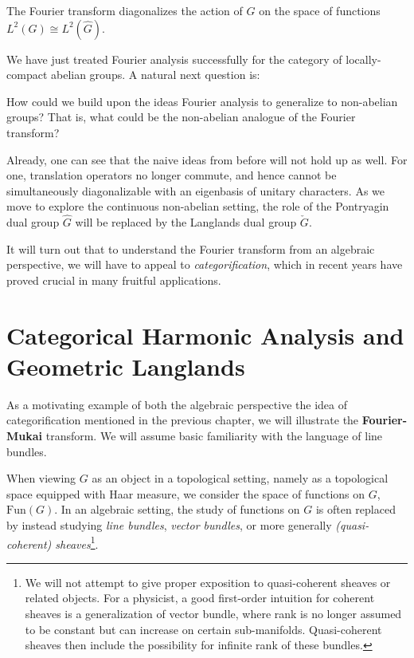 \begin{fact}
	The Fourier transform diagonalizes the action of $G$ on the space of functions $L^2(G) \cong L^2(\hat G)$.
\end{fact}

We have just treated Fourier analysis successfully for the category of locally-compact abelian groups. A natural next question is:
\begin{ques}
	How could we build upon the ideas Fourier analysis to generalize to non-abelian groups? That is, what could be the non-abelian analogue of the Fourier transform?
\end{ques}
Already, one can see that the naive ideas from before will not hold up as well. For one, translation operators no longer commute, and hence cannot be simultaneously diagonalizable with an eigenbasis of unitary characters. As we move to explore the continuous non-abelian setting, the role of the Pontryagin dual group $\hat G$ will be replaced by the Langlands dual group $\check G$.

It will turn out that to understand the Fourier transform from an algebraic perspective, we will have to appeal to \emph{categorification}, which in recent years have proved crucial in many fruitful applications.


\section{Categorical Harmonic Analysis and Geometric Langlands} %
\label{sec:categorical_harmonic_analysis_and_geometric_langlands}

As a motivating example of both the algebraic perspective the idea of categorification mentioned in the previous chapter, we will illustrate the \textbf{Fourier-Mukai} transform. We will assume basic familiarity with the language of line bundles. 

When viewing $G$ as an object in a topological setting, namely as a topological space equipped with Haar measure, we consider the space of functions on $G$, $\mathrm{Fun}(G)$. In an algebraic setting, the study of functions on $G$ is often replaced by instead studying \emph{line bundles}, \emph{vector bundles}, or more generally \emph{(quasi-coherent) sheaves}\footnote{We will not attempt to give proper exposition to quasi-coherent sheaves or related objects. For a physicist, a good first-order intuition for coherent sheaves is a generalization of vector bundle, where rank is no longer assumed to be constant but can increase on certain sub-manifolds. Quasi-coherent sheaves then include the possibility for infinite rank of these bundles.}.


